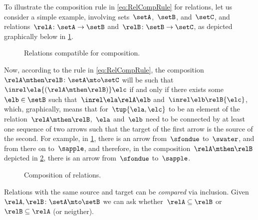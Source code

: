 To illustrate the composition rule in \cref{eq:RelCompRule} for relations, let us consider a simple example, involving sets~$\setA$,~$\setB$, and~$\setC$, and relations~$\relA \colon \setA \to \setB$ and~$\relB \colon \setB \to \setC$, as depicted graphically below in \cref{fig:example_rel_composable}.
%
\begin{figure}[h!]
    \centering
    \caption{Relations compatible for composition.}
    \label{fig:example_rel_composable}
\end{figure}
%
Now, according to the rule in \cref{eq:RelCompRule}, the composition~$\relA \mthen \relB \colon \setA \mto \setC$ will be such that~$\inrel \ela {(\relA \mthen \relB)} \elc$ if and only if there exists some~$\elb \in \setB$ such that~$\inrel \ela \relA \elb $ and~$\inrel \elb \relB{\elc}$, which, graphically, means that for~$\tup{\ela,\elc}$ to be an element of the relation~$\relA \mthen \relB$,~$\ela$ and~$\elb$ need to be connected by at least one sequence of two arrows such that the target of the first arrow is the source of the second.
For example, in \cref{fig:example_rel_composable}, there is an arrow from~$\sfondue$ to~$\swater$, and from there on to~$\sapple$, and therefore, in the composition~$\relA \mthen \relB$ depicted in \cref{fig:example_rel_composed}, there is an arrow from~$\sfondue$ to~$\sapple$.
%
\begin{figure}[h!]
    \centering
    \caption{Composition of relations.}
    \label{fig:example_rel_composed}
\end{figure}

\begin{remark}
    Relations with the same source and target can be \emph{compared} via inclusion.
    Given~$\relA, \relB \colon \setA\mto \setB$  we can ask whether~$\relA\subseteq \relB$ or~$\relB\subseteq \relA$ (or neigther).
\end{remark}
